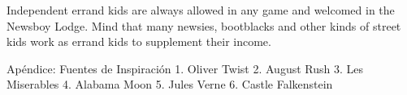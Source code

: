 Independent errand kids are always allowed in any game and welcomed in the Newsboy Lodge. Mind that many newsies, bootblacks and other kinds of street kids work as errand kids to supplement their income.


Apéndice: Fuentes de Inspiración
1. Oliver Twist
2. August Rush
3. Les Miserables
4. Alabama Moon
5. Jules Verne
6. Castle Falkenstein